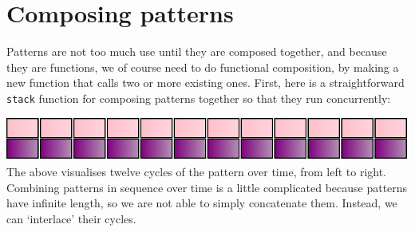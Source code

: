\section{Composing patterns}\label{composing-patterns}

Patterns are not too much use until they are composed together, and
because they are functions, we of course need to do functional
composition, by making a new function that calls two or more existing
ones. First, here is a straightforward \texttt{stack} function for
composing patterns together so that they run concurrently:

\begin{Shaded}
\begin{Highlighting}[]
\NormalTok{ [}\NormalTok{ a] }\OtherTok{{-}\textgreater{}} 
\OtherTok{=}  \OperatorTok{$}\OtherTok{{-}\textgreater{}} \NormalTok{ (}
\end{Highlighting}
\end{Shaded}

\begin{Shaded}
\begin{Highlighting}[]
\OtherTok{=}\NormalTok{ stack [atom }\NormalTok{]}
\end{Highlighting}
\end{Shaded}

\includegraphics{../figures/fig1.pdf}\\

The above visualises twelve cycles of the pattern over time, from left
to right. Combining patterns in sequence over time is a little
complicated because patterns have infinite length, so we are not able to
simply concatenate them. Instead, we can `interlace' their cycles.

